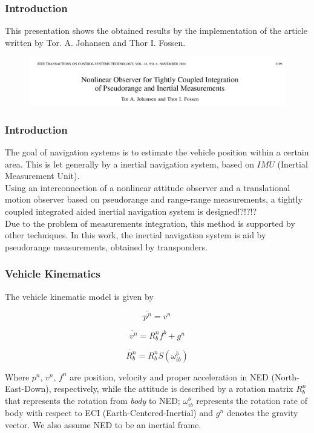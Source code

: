 \documentclass{beamer}
\begin{document}
	\begin{frame}
		\frametitle{Introduction}
		This presentation shows the obtained results by the implementation of the article written by Tor. A. Johansen and Thor I. Fossen.
		\vspace{0.5cm}
		
	\begin{figure}[H]
			\centering
			\includegraphics[scale=0.3]{title}
		\end{figure}
	\end{frame}

	\begin{frame}
		\frametitle{Introduction}
	The goal of navigation systems is to estimate the vehicle position within a certain area. This is let generally by a inertial navigation system, based on $IMU$ (Inertial Measurement Unit).\\
	
	Using an interconnection of a nonlinear attitude observer and a translational motion observer based on pseudorange and range-range measurements, a tightly coupled integrated aided inertial navigation system is designed!?!?!?\\
	
	Due to the problem of measurements integration, this method is supported by other techniques. In this work, the inertial navigation system is aid by pseudorange measurements, obtained by transponders.
	\end{frame}


	\begin{frame}
	\frametitle{Vehicle Kinematics}
	The vehicle kinematic model is given by
	
	\[ \dot{p^n} = v^n \]
	
	\[ \dot{v^n} = R^n_b f^b + g^n\]
	
	\[ \dot{R^n_b} = R^n_bS(\omega^b_{ib}) \]
	
	Where $p^n$, $v^n$, $f^n$ are position, velocity and proper acceleration in NED (North-East-Down), respectively, while the attitude is described by a rotation matrix $R^n_b$ that represents the rotation from \textit{body} to NED; $\omega^b_{ib}$ represents the rotation rate of body with respect to ECI (Earth-Centered-Inertial) and $g^n$ denotes the gravity vector. We also assume NED to be an inertial frame. 
	
	\end{frame}
	
\end{document}
